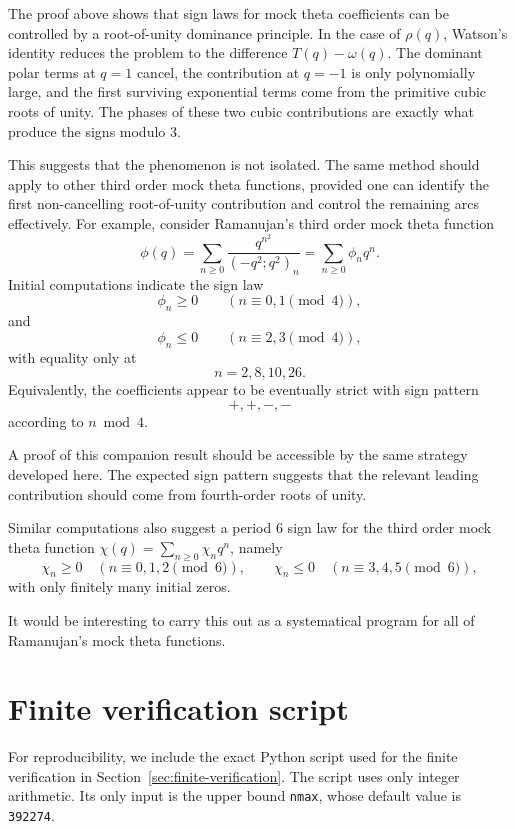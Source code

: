 \documentclass[11pt]{article}
\theoremstyle{remark}
\begin{document}
The proof above shows that sign laws for mock theta coefficients can be controlled by a root-of-unity dominance principle.  In the case of \(\rho(q)\), Watson's identity reduces the problem to the difference \(T(q)-\omega(q)\).  The dominant polar terms at \(q=1\) cancel, the contribution at \(q=-1\) is only polynomially large, and the first surviving exponential terms come from the primitive cubic roots of unity.  The phases of these two cubic contributions are exactly what produce the signs modulo \(3\).

This suggests that the phenomenon is not isolated.  The same method should apply to other third order mock theta functions, provided one can identify the first non-cancelling root-of-unity contribution and control the remaining arcs effectively.  For example, consider Ramanujan's third order mock theta function
\[
\phi(q)=\sum_{n\geq0}\frac{q^{n^2}}{(-q^2;q^2)_n}
=
\sum_{n\geq0}\phi_n q^n.
\]
Initial computations indicate the sign law
\[
\phi_n\geq0\qquad(n\equiv0,1\pmod4),
\]
and
\[
\phi_n\leq0\qquad(n\equiv2,3\pmod4),
\]
with equality only at
\[
n=2,8,10,26.
\]
Equivalently, the coefficients appear to be eventually strict with sign pattern
\[
+,+,-,-
\]
according to \(n\bmod4\).

\noindent A proof of this companion result should be accessible by the same strategy developed here. 
The expected sign pattern suggests that the relevant leading contribution should come from fourth-order roots of unity. 

Similar computations also suggest a period \(6\) sign law for the third order mock theta function \(\chi(q)=\sum_{n\geq0}\chi_n q^n\), namely
\[
\chi_n\geq0\quad(n\equiv0,1,2\pmod6),\qquad
\chi_n\leq0\quad(n\equiv3,4,5\pmod6),
\]
with only finitely many initial zeros.



\noindent It would be interesting to carry this out as a systematical program for all of Ramanujan's mock theta functions. 

\appendix


\section{Finite verification script}\label{app:verification-code}

For reproducibility, we include the exact Python script used for the finite verification in
Section~\ref{sec:finite-verification}.  The script uses only integer arithmetic.  Its only input is
the upper bound \texttt{nmax}, whose default value is \texttt{392274}.
\end{document}

